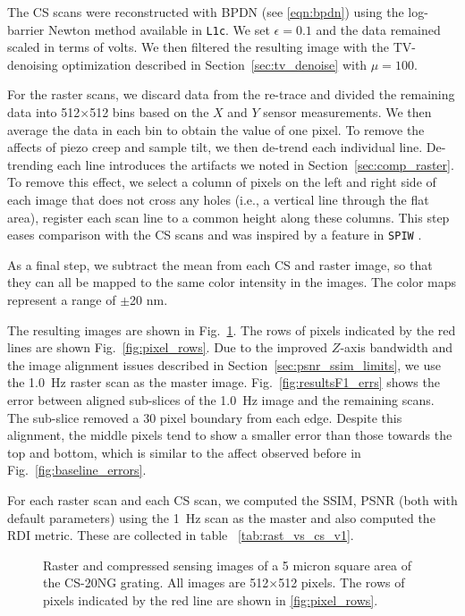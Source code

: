 \documentclass[twocolumn,twoside]{IEEEtran/IEEEtran}
\newcommand{\xc}{\ensuremath{X}\xspace}
\newcommand{\yc}{\ensuremath{Y}\xspace}
\begin{document}
The CS scans were reconstructed with BPDN (see \eqref{eqn:bpdn}) using the
log-barrier Newton method available in \texttt{L1c}\cite{L1c}. We set
$\epsilon = 0.1$ and the data remained scaled in terms of volts. We then
filtered the resulting image with the TV-denoising optimization described in
Section~\ref{sec:tv_denoise} with $\mu=100$.

For the raster scans, we discard data from the re-trace and divided the
remaining data into 512$\times$512 bins based on the \xc and \yc sensor
measurements. We then average the data in each bin to obtain the value of one
pixel. To remove the affects of piezo creep and sample tilt, we then de-trend
each individual line. De-trending each line introduces the artifacts we noted in
Section~\ref{sec:comp_raster}. To remove this effect, we select a column of
pixels on the left and right side of each image that does not cross any holes
(i.e., a vertical line through the flat area), register each scan line to a
common height along these columns. This step eases comparison with the CS scans
and was inspired by a feature in \texttt{SPIW} \cite{spiw}.

As a final step, we subtract the mean from each CS and raster image, so that
they can all be mapped to the same color intensity in the images. The color maps
represent a range of $\pm$20 nm.


The resulting images are shown in Fig.~\ref{fig:resultsF1_images}. The rows of
pixels indicated by the red lines are shown Fig.~\ref{fig:pixel_rows}. Due to
the improved $Z$-axis bandwidth and the image alignment issues described in
Section~\ref{sec:psnr_ssim_limits}, we use the 1.0~Hz raster scan as the master
image. Fig.~\ref{fig:resultsF1_errs} shows the error between aligned sub-slices
of the 1.0~Hz image and the remaining scans. The sub-slice removed a 30 pixel
boundary from each edge. Despite this alignment, the middle pixels tend to show
a smaller error than those towards the top and bottom, which is similar to the
affect observed before in Fig.~\ref{fig:baseline_errors}.

For each raster scan and each CS scan, we computed the SSIM, PSNR (both with
default parameters) using the 1~Hz scan as the master and also computed the RDI
metric. These are collected in table ~\ref{tab:rast_vs_cs_v1}.

\begin{figure}
  
  \caption{Raster and compressed sensing images of a 5 micron square area of the
    CS-20NG grating. All images are 512$\times$512 pixels. The rows of pixels
    indicated by the red line are shown in \ref{fig:pixel_rows}.}
  \label{fig:resultsF1_images}
\end{figure}
\end{document}

